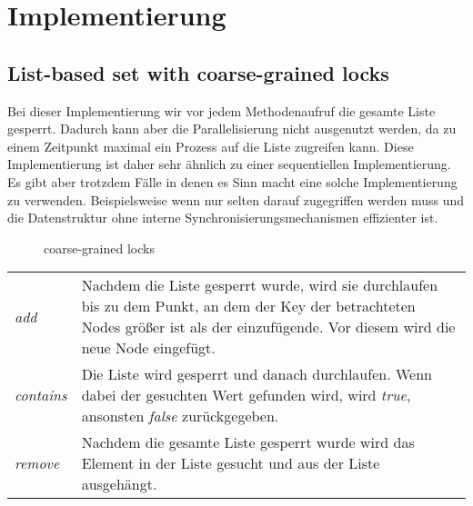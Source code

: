 \section{Implementierung}
\label{sec:implementation}
\subsection{List-based set with coarse-grained locks}

Bei dieser Implementierung wir vor jedem Methodenaufruf die gesamte Liste gesperrt. Dadurch kann aber die Parallelisierung 
nicht ausgenutzt werden, da zu einem Zeitpunkt maximal ein Prozess auf die Liste zugreifen kann. Diese Implementierung ist 
daher sehr ähnlich zu einer sequentiellen Implementierung. Es gibt aber trotzdem Fälle in denen es Sinn macht eine solche Implementierung zu verwenden.
Beispielsweise wenn nur selten darauf zugegriffen werden muss und die Datenstruktur ohne interne Synchronisierungsmechanismen effizienter ist.

\begin{figure}[H]
	\centering
	\caption{coarse-grained locks}
	\label{tik:coarse-grained}
\end{figure}

\begin{table}[H]
    \begin{tabularx}{\textwidth}{lX}
        \textit{add} & Nachdem die Liste gesperrt wurde, wird sie durchlaufen bis zu dem Punkt, an dem der Key der betrachteten Nodes größer ist als der einzufügende. Vor diesem wird die neue Node eingefügt. \\
        \textit{contains} & Die Liste wird gesperrt und danach durchlaufen. Wenn dabei der gesuchten Wert gefunden wird, wird \textit{true}, ansonsten \textit{false} zurückgegeben.\\
        \textit{remove} & Nachdem die gesamte Liste gesperrt wurde wird das Element in der Liste gesucht und aus der Liste ausgehängt. \\
    \end{tabularx}
\end{table}


